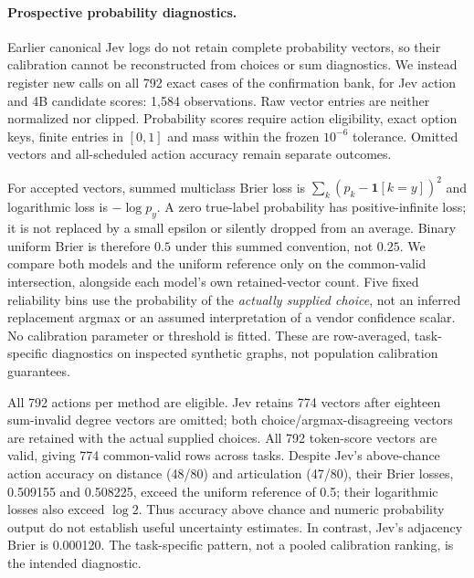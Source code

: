 \paragraph{Prospective probability diagnostics.}
Earlier canonical Jev logs do not retain complete probability vectors,
so their calibration cannot be reconstructed from choices or sum diagnostics.
We instead register new calls on all 792 exact cases of the confirmation
bank, for Jev action and 4B candidate scores: 1,584 observations.
Raw vector entries are neither normalized nor clipped. Probability scores
require action eligibility, exact option keys, finite entries in $[0,1]$
and mass within the frozen $10^{-6}$ tolerance. Omitted vectors and
all-scheduled action accuracy remain separate outcomes.

For accepted vectors, summed multiclass Brier loss is
$\sum_k(p_k-\mathbf{1}[k=y])^2$ and logarithmic loss is $-\log p_y$.
A zero true-label probability has positive-infinite loss; it is not replaced
by a small epsilon or silently dropped from an average. Binary uniform
Brier is therefore $0.5$ under this summed convention, not $0.25$.
We compare both models and the uniform reference only on the common-valid
intersection, alongside each model's own retained-vector count.
Five fixed reliability bins use the probability of the \emph{actually
supplied choice}, not an inferred replacement argmax or an assumed interpretation
of a vendor confidence scalar. No calibration parameter or threshold is fitted.
These are row-averaged, task-specific diagnostics on inspected synthetic
graphs, not population calibration guarantees.

All 792 actions per method are eligible. Jev retains 774 vectors after
eighteen sum-invalid degree vectors are omitted; both choice/argmax-disagreeing
vectors are retained with the actual supplied choices. All 792 token-score
vectors are valid, giving 774 common-valid rows across tasks.
Despite Jev's above-chance action accuracy on distance (48/80) and articulation
(47/80), their Brier losses, 0.509155 and 0.508225, exceed the uniform
reference of 0.5; their logarithmic losses also exceed $\log 2$.
Thus accuracy above chance and numeric probability output do not establish
useful uncertainty estimates. In contrast, Jev's adjacency Brier is
0.000120. The task-specific pattern, not a pooled calibration ranking, is
the intended diagnostic.

\begin{table}[t]
\centering\small

\caption{Prospective probability audit: summed multiclass Brier, lower is
better. ``Valid J/T'' gives each method's own vector denominator; loss
columns use exactly the common-valid rows. Uniform is evaluated on the same
rows with their actual option cardinalities. No cross-task aggregate is used.}
\label{tab:brier}
\end{table}

